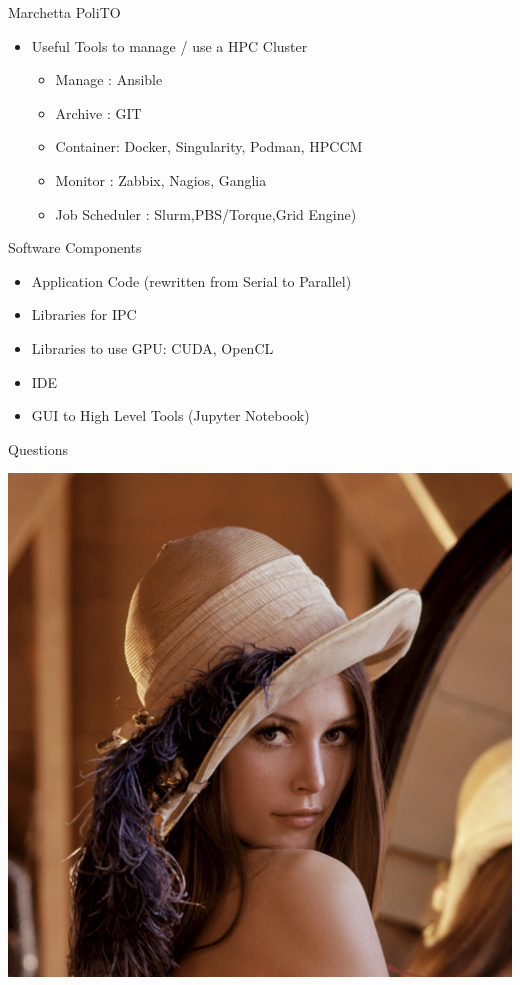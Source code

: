\documentclass[ignorenonframetext,]{beamer}
\providecommand{\tightlist}{%
  \setlength{\itemsep}{0pt}\setlength{\parskip}{0pt}}
\begin{document}
\begin{frame}{Marchetta PoliTO}

\begin{itemize}
\tightlist
\item
  Useful Tools to manage / use a HPC Cluster

  \begin{itemize}
  \tightlist
  \item
    Manage : Ansible
  \item
    Archive : GIT
  \item
    Container: Docker, Singularity, Podman, HPCCM
  \item
    Monitor : Zabbix, Nagios, Ganglia
  \item
    Job Scheduler : Slurm,PBS/Torque,Grid Engine)
  \end{itemize}

\end{itemize}


\end{frame}

\begin{frame}{Software Components}

\begin{itemize}
\tightlist
\item
  Application Code (rewritten from Serial to Parallel)
\item
  Libraries for IPC
\item
  Libraries to use GPU: CUDA, OpenCL
\item
  IDE
\item
  GUI to High Level Tools (Jupyter Notebook)
\end{itemize}


\end{frame}

\begin{frame}{Questions}

\includegraphics{images/Lenna-Q1.png}

\end{frame}
\end{document}
